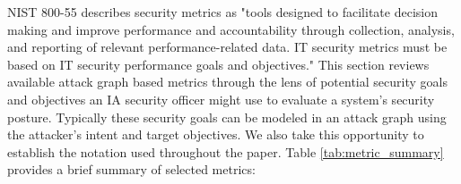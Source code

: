 NIST 800-55\cite{Swanson_Bartol_Sabato_Hash_Graffo_2003} describes security metrics as "tools designed to facilitate decision making and improve performance and accountability through collection, analysis, and reporting of relevant performance-related data. IT security metrics must be based on IT security performance goals and objectives." This section reviews available attack graph based metrics through the lens of potential security goals and objectives an IA security officer might use to evaluate a system's security posture. Typically these security goals can be modeled in an attack graph using the attacker's intent and target objectives. We also take this opportunity to establish the notation used throughout the paper. Table \ref{tab:metric_summary} provides a brief summary of selected metrics: 
\begin{table}[ht]
\caption{Metrics Summary}
\end{table}

